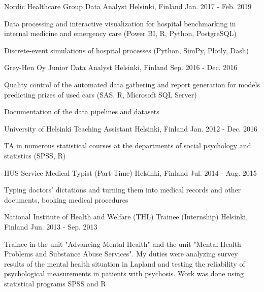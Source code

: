 \begin{cventries}
  \cventry
    {Nordic Healthcare Group} %
    {Data Analyst} %
    {Helsinki, Finland} %
    {Jan. 2017 - Feb. 2019} %
    {
      \begin{cvitems}
        \item {Data processing and interactive visualization for hospital benchmarking
        in internal medicine and emergency care (Power BI, R, Python, PostgreSQL)}
        \item {Discrete-event simulations of hospital processes (Python, SimPy, Plotly, Dash)}
      \end{cvitems}
    }

  \cventry
    {Grey-Hen Oy} %
    {Junior Data Analyst} %
    {Helsinki, Finland} %
    {Sep. 2016 - Dec. 2016} %
    {
      \begin{cvitems}
        \item {Quality control of the automated data gathering and report generation
        for models predicting prizes of used cars (SAS, R, Microsoft SQL Server)}
        \item {Documentation of the data pipelines and datasets}
      \end{cvitems}
    }

  \cventry
    {University of Helsinki} %
    {Teaching Assistant} %
    {Helsinki, Finland} %
    {Jan. 2012 - Dec. 2016} %
    {
      \begin{cvitems}
        \item {TA in numerous statistical courses at the departments of social
        psychology and statistics (SPSS, R)}
      \end{cvitems}
    }

  \cventry
    {HUS Service} %
    {Medical Typist (Part-Time)} %
    {Helsinki, Finland} %
    {Jul. 2014 - Aug. 2015} %
    {
      \begin{cvitems}
        \item {Typing doctors' dictations and turning them into medical records and
        other documents, booking medical procedures}
      \end{cvitems}
    }

  \cventry
    {National Institute of Health and Welfare (THL)} %
    {Trainee (Internship)} %
    {Helsinki, Finland} %
    {Jun. 2013 - Sep. 2013} %
    {
      \begin{cvitems}
        \item {Trainee in the unit "Advancing Mental Health" and the unit
        "Mental Health Problems and Substance Abuse Services".
        My duties were analyzing survey results of the mental health situation
        in Lapland and testing the reliability of psychological measurements
        in patients with psychosis. Work was done using statistical programs SPSS and R}
      \end{cvitems}
    }


\end{cventries}
